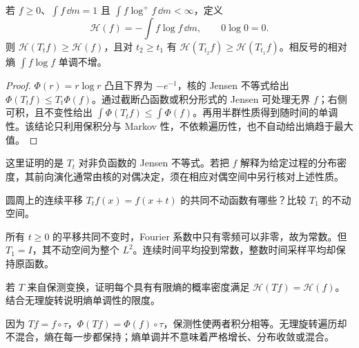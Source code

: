 \begin{theorem}[$H$-定理：熵的单调性]\label{thm:y13-entropy}
若 $f\ge0$、$\int f\,\dd m=1$ 且 $\int f\log^+f\,\dd m<\infty$，定义
\[
 \mathcal H(f)=-\int f\log f\,\dd m,\qquad 0\log0=0.
\]
则 $\mathcal H(T_tf)\ge\mathcal H(f)$，且对 $t_2\ge t_1$ 有 $\mathcal H(T_{t_2}f)\ge\mathcal H(T_{t_1}f)$。相反号的相对熵 $\int f\log f$ 单调不增。
\end{theorem}
\begin{proof}
$\Phi(r)=r\log r$ 凸且下界为 $-e^{-1}$，核的 Jensen 不等式给出 $\Phi(T_tf)\le T_t\Phi(f)$。通过截断凸函数或积分形式的 Jensen 可处理无界 $f$；右侧可积，且不变性给出 $\int\Phi(T_tf)\le\int\Phi(f)$。再用半群性质得到随时间的单调性。该结论只利用保积分与 Markov 性，不依赖遍历性，也不自动给出熵趋于最大值。
\end{proof}

这里证明的是 $T_t$ 对非负函数的 Jensen 不等式。若把 $f$ 解释为给定过程的分布密度，其前向演化通常由核的对偶决定，须在相应对偶空间中另行核对上述性质。

\begin{exercise}[采样共振]\label{ex:y13-sampling}
圆周上的连续平移 $T_tf(x)=f(x+t)$ 的共同不动函数有哪些？比较 $T_1$ 的不动空间。
\end{exercise}
\begin{solution}
所有 $t\ge0$ 的平移共同不变时，Fourier 系数中只有零频可以非零，故为常数。但 $T_1=I$，其不动空间为整个 $L^2$。连续时间平均投到常数，整数时间采样平均却保持原函数。
\end{solution}

\begin{exercise}[熵不保证混合]\label{ex:y13-entropy-rotation}
若 $T$ 来自保测变换，证明每个具有有限熵的概率密度满足 $\mathcal H(Tf)=\mathcal H(f)$。结合无理旋转说明熵单调性的限度。
\end{exercise}
\begin{solution}
因为 $Tf=f\circ\tau$，$\Phi(Tf)=\Phi(f)\circ\tau$，保测性使两者积分相等。无理旋转遍历却不混合，熵在每一步都保持；熵单调并不意味着严格增长、分布收敛或混合。
\end{solution}
